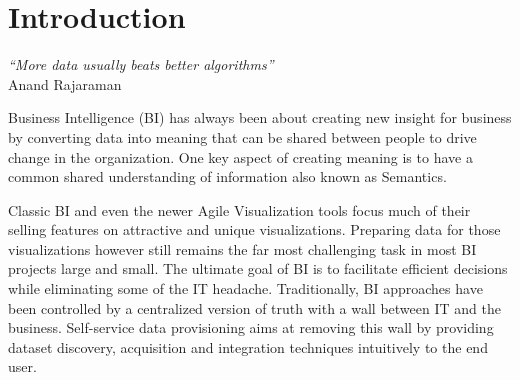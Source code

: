 \chapter{Introduction} \label{chapter:introduction}

\begin{flushright}
    \textit{``More data usually beats better algorithms''}\\
    Anand Rajaraman

\end{flushright}

Business Intelligence (BI) has always been about creating new insight for business by converting data into meaning that can be shared between people to drive change in the organization. One key aspect of creating meaning is to have a common shared understanding of information also known as Semantics.

Classic BI and even the newer Agile Visualization tools focus much of their selling features on attractive and unique visualizations. Preparing data for those visualizations however still remains the far most challenging task in most BI projects large and small. The ultimate goal of BI is to facilitate efficient decisions while eliminating some of the IT headache. Traditionally, BI approaches have been controlled by a centralized version of truth with a wall between IT and the business. Self-service data provisioning aims at removing this wall by providing dataset discovery, acquisition and integration techniques intuitively to the end user.
